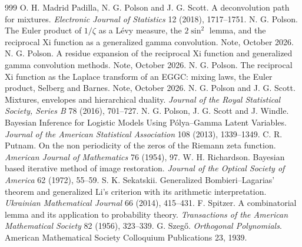 \begin{thebibliography}{999}
 O. H. Madrid Padilla, N. G. Polson and J. G. Scott. A deconvolution path for mixtures. \emph{Electronic Journal of Statistics} 12 (2018), 1717--1751.
 N. G. Polson. The Euler product of $1/\zeta$ as a L\'evy measure, the $2\sin^2$ lemma, and the reciprocal Xi function as a generalized gamma convolution. Note, October 2026.
 N. G. Polson. A residue expansion of the reciprocal Xi function and generalized gamma convolution methods. Note, October 2026.
 N. G. Polson. The reciprocal Xi function as the Laplace transform of an EGGC: mixing laws, the Euler product, Selberg and Barnes. Note, October 2026.
 N. G. Polson and J. G. Scott. Mixtures, envelopes and hierarchical duality. \emph{Journal of the Royal Statistical Society, Series B} 78 (2016), 701--727.
 N. G. Polson, J. G. Scott and J. Windle. Bayesian Inference for Logistic Models Using P\'olya--Gamma Latent Variables. \emph{Journal of the American Statistical Association} 108 (2013), 1339--1349.
 C. R. Putnam. On the non periodicity of the zeros of the Riemann zeta function. \emph{American Journal of Mathematics} 76 (1954), 97.
 W. H. Richardson. Bayesian based iterative method of image restoration. \emph{Journal of the Optical Society of America} 62 (1972), 55--59.
 S. K. Sekatskii. Generalized Bombieri--Lagarias' theorem and generalized Li's criterion with its arithmetic interpretation. \emph{Ukrainian Mathematical Journal} 66 (2014), 415--431.
 F. Spitzer. A combinatorial lemma and its application to probability theory. \emph{Transactions of the American Mathematical Society} 82 (1956), 323--339.
 G. Szeg\H o. \emph{Orthogonal Polynomials}. American Mathematical Society Colloquium Publications 23, 1939.

\end{thebibliography}
